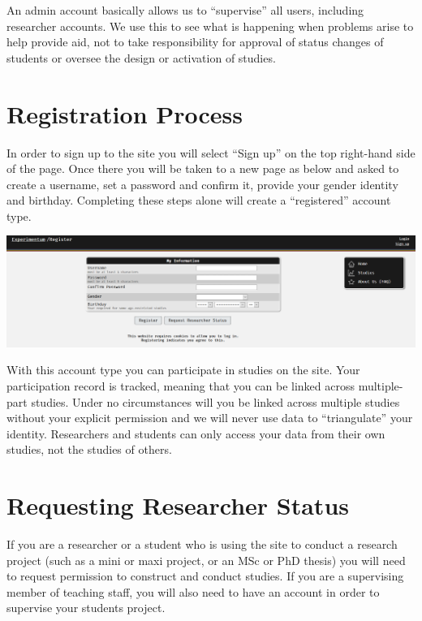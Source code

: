 \documentclass[]{book}
\begin{document}
An admin account basically allows us to ``supervise'' all users, including researcher accounts. We use this to see what is happening when problems arise to help provide aid, not to take responsibility for approval of status changes of students or oversee the design or activation of studies.

\hypertarget{registration-process}{%
\section{Registration Process}\label{registration-process}}

In order to sign up to the site you will select ``Sign up'' on the top right-hand side of the page. Once there you will be taken to a new page as below and asked to create a username, set a password and confirm it, provide your gender identity and birthday. Completing these steps alone will create a ``registered'' account type.

\includegraphics{images/screenshots/register.png}

With this account type you can participate in studies on the site. Your participation record is tracked, meaning that you can be linked across multiple-part studies. Under no circumstances will you be linked across multiple studies without your explicit permission and we will never use data to ``triangulate'' your identity. Researchers and students can only access your data from their own studies, not the studies of others.

\hypertarget{requesting-researcher-status}{%
\section{Requesting Researcher Status}\label{requesting-researcher-status}}

If you are a researcher or a student who is using the site to conduct a research project (such as a mini or maxi project, or an MSc or PhD thesis) you will need to request permission to construct and conduct studies. If you are a supervising member of teaching staff, you will also need to have an account in order to supervise your students project.
\end{document}

